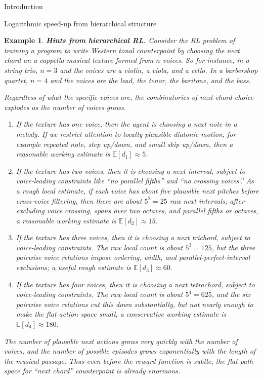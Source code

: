 \documentclass[11pt]{article}
\newtheorem{example}[subsubsection]{Example}
\begin{document}
\begin{section}{Introduction}
\begin{subsection}{Logarithmic speed-up from hierarchical structure}
\begin{example}
{\bf Hints from hierarchical RL.}
\normalfont
Consider the RL problem of training a program to write Western tonal counterpoint by choosing the next chord an {\em a cappella} musical texture formed from $n$ voices. So for instance, in a string trio, $n=3$ and the voices are a violin, a viola, and a cello. In a barbershop quartet, $n=4$ and the voices are the lead, the tenor,  the baritone, and the bass.

Regardless of what the specific voices are, the combinatorics of next-chord choice explodes as the number of voices grows.
\begin{enumerate}
\item
If the texture has one voice, then the agent is choosing a next note in a melody. If we restrict attention to locally plausible diatonic motion, for example repeated note, step up/down, and small skip up/down, then a reasonable working estimate is $\mathbb{E}[d_1]\approx 5$.
\item
If the texture has two voices, then it is choosing a next interval, subject to voice-leading constraints like ``no parallel fifths'' and ``no crossing voices'.' As a rough local estimate, if each voice has about five plausible next pitches before cross-voice filtering, then there are about $5^2=25$ raw next intervals; after excluding voice crossing, spans over two octaves, and parallel fifths or octaves, a reasonable working estimate is $\mathbb{E}[d_2]\approx 15$.
\item
If the texture has three voices, then it is choosing a next trichord, subject to voice-leading constraints. The raw local count is about $5^3=125$, but the three pairwise voice relations impose ordering, width, and parallel-perfect-interval exclusions; a useful rough estimate is $\mathbb{E}[d_3]\approx 60$.
\item
If the texture has four voices, then it is choosing a next tetrachord, subject to voice-leading constraints. The raw local count is about $5^4=625$, and the six pairwise voice relations cut this down substantially, but not nearly enough to make the flat action space small; a conservative working estimate is $\mathbb{E}[d_4]\approx 180$.
\end{enumerate}
The number of plausible next actions grows very quickly with the number of voices, and the number of possible episodes grows exponentially with the length of the musical passage. Thus even before the reward function is subtle, the flat path space for ``next chord'' counterpoint is already enormous.


\end{example}
\end{subsection}
\end{section}
\end{document}
